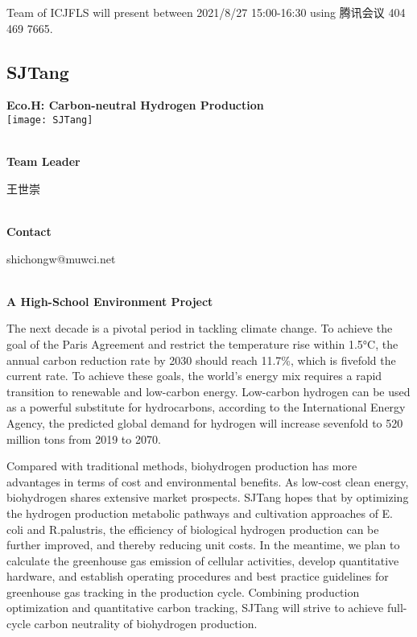 Team of ICJFLS will present between  2021/8/27 15:00-16:30       using 腾讯会议 404 469 7665.
\newpage


\subsection{\textcolor{Blu}{ SJTang } }
\vspace{5mm}
\begin{center}
\large{
  \textbf{ Eco.H: Carbon-neutral Hydrogen Production }\\
  \texttt{[image: SJTang]}
}
\end{center}
\textbf{\\Team Leader}

  王世崇


\textbf{\\Contact}

  shichongw@muwci.net


\textbf{\\A High-School Environment Project\\}\begin{spacing}{1.5}

The next decade is a pivotal period in tackling climate change. To achieve the goal of the Paris Agreement and restrict the temperature rise within 1.5°C, the annual carbon reduction rate by 2030 should reach 11.7\%, which is fivefold the current rate. To achieve these goals, the world’s energy mix requires a rapid transition to renewable and low-carbon energy. Low-carbon hydrogen can be used as a powerful substitute for hydrocarbons, according to the International Energy Agency, the predicted global demand for hydrogen will increase sevenfold to 520 million tons from 2019 to 2070.

Compared with traditional methods, biohydrogen production has more advantages in terms of cost and environmental benefits. As low-cost clean energy, biohydrogen shares extensive market prospects. SJTang hopes that by optimizing the hydrogen production metabolic pathways and cultivation approaches of E. coli and R.palustris, the efficiency of biological hydrogen production can be further improved, and thereby reducing unit costs. In the meantime, we plan to calculate the greenhouse gas emission of cellular activities, develop quantitative hardware, and establish operating procedures and best practice guidelines for greenhouse gas tracking in the production cycle. Combining production optimization and quantitative carbon tracking, SJTang will strive to achieve full-cycle carbon neutrality of biohydrogen production.\end{spacing}
\\

